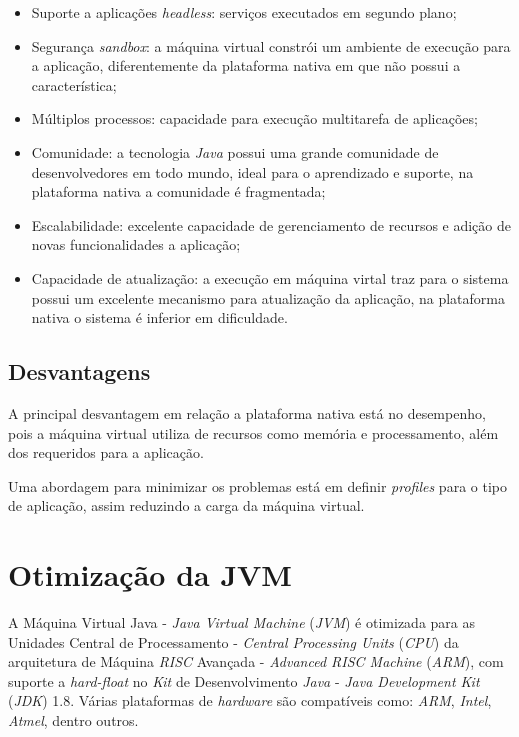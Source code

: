 \begin{itemize}

    \item Suporte a aplicações \textit{headless}: serviços executados em
    segundo plano;

    \item Segurança \textit{sandbox}: a máquina virtual constrói um ambiente de
    execução para a aplicação, diferentemente da plataforma nativa em que não
    possui a característica;

    \item Múltiplos processos: capacidade para execução multitarefa de
    aplicações;

    \item Comunidade: a tecnologia \textit{Java} possui uma grande comunidade
    de desenvolvedores em todo mundo, ideal para o aprendizado e suporte, na
    plataforma nativa a comunidade é fragmentada;

    \item Escalabilidade: excelente capacidade de gerenciamento de recursos e
    adição de novas funcionalidades a aplicação;

    \item Capacidade de atualização: a execução em máquina virtal traz para o
    sistema possui um excelente mecanismo para atualização da aplicação, na
    plataforma nativa o sistema é inferior em dificuldade.

\end{itemize}

\subsection{Desvantagens}

A principal desvantagem em relação a plataforma nativa está no desempenho, pois
a máquina virtual utiliza de recursos como memória e processamento, além dos
requeridos para a aplicação.

Uma abordagem para minimizar os problemas está em definir \textit{profiles}
para o tipo de aplicação, assim reduzindo a carga da máquina virtual.

\section{Otimização da JVM}

A Máquina Virtual Java - \textit{Java Virtual Machine} (\textit{JVM}) é
otimizada para as Unidades Central de Processamento - \textit{Central
  Processing Units} (\textit{CPU}) da arquitetura de Máquina \textit{RISC} 
  Avançada - \textit{Advanced RISC Machine} (\textit{ARM}), com suporte a
\textit{hard-float} no \textit{Kit} de Desenvolvimento \textit{Java} -
\textit{Java Development Kit} (\textit{JDK}) 1.8. Várias plataformas de
\textit{hardware} são compatíveis como: \textit{ARM}, \textit{Intel},
\textit{Atmel}, dentro outros.
